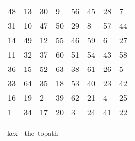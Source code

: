 \begin{isabellebody}
\begin{isamarkuptext}
  \begin{table}[H]
    \begin{tabular}{llllllll}
      48 & 13 & 30 &  9 & 56 & 45 & 28 &  7 \\
      31 & 10 & 47 & 50 & 29 &  8 & 57 & 44 \\
      14 & 49 & 12 & 55 & 46 & 59 &  6 & 27 \\
      11 & 32 & 37 & 60 & 51 & 54 & 43 & 58 \\
      36 & 15 & 52 & 63 & 38 & 61 & 26 &  5 \\
      33 & 64 & 35 & 18 & 53 & 40 & 23 & 42 \\
      16 & 19 &  2 & 39 & 62 & 21 &  4 & 25 \\
       1 & 34 & 17 & 20 &  3 & 24 & 41 & 22
    \end{tabular}
  \end{table}%
\end{isamarkuptext}\isamarkuptrue%
\isamarkupfalse%
\ {\isachardoublequoteopen}kc{}x{}\ {\isasymequiv}\ the\ {\isacharparenleft}{\kern0pt}to{\isacharunderscore}{\kern0pt}path\ \isanewline
\ \ {\isacharbrackleft}{\kern0pt}{\isacharbrackleft}{\kern0pt}{}{}{\isacharcomma}{\kern0pt}{}{}{\isacharcomma}{\kern0pt}{}{}{\isacharcomma}{\kern0pt}{}{\isacharcomma}{\kern0pt}{}{}{\isacharcomma}{\kern0pt}{}{}{\isacharcomma}{\kern0pt}{}{}{\isacharcomma}{\kern0pt}{}{\isacharbrackright}{\kern0pt}{\isacharcomma}{\kern0pt}\isanewline
\ \ {\isacharbrackleft}{\kern0pt}{}{}{\isacharcomma}{\kern0pt}{}{}{\isacharcomma}{\kern0pt}{}{}{\isacharcomma}{\kern0pt}{}{}{\isacharcomma}{\kern0pt}{}{}{\isacharcomma}{\kern0pt}{}{\isacharcomma}{\kern0pt}{}{}{\isacharcomma}{\kern0pt}{}{}{\isacharbrackright}{\kern0pt}{\isacharcomma}{\kern0pt}\isanewline
\ \ {\isacharbrackleft}{\kern0pt}{}{}{\isacharcomma}{\kern0pt}{}{}{\isacharcomma}{\kern0pt}{}{}{\isacharcomma}{\kern0pt}{}{}{\isacharcomma}{\kern0pt}{}{}{\isacharcomma}{\kern0pt}{}{}{\isacharcomma}{\kern0pt}{}{\isacharcomma}{\kern0pt}{}{}{\isacharbrackright}{\kern0pt}{\isacharcomma}{\kern0pt}\isanewline

\end{isabellebody}
